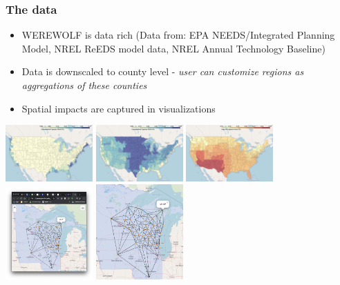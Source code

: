 \documentclass[xcolor=dvipsnames]{beamer}
\begin{document}
\begin{frame}
  \frametitle{The data}

\begin{itemize}
  \item WEREWOLF is data rich (Data from: EPA NEEDS/Integrated Planning Model, NREL ReEDS model data, NREL Annual Technology Baseline)
  \item Data is downscaled to county level - \emph{user can customize regions as aggregations of these counties}
  \item Spatial impacts are captured in visualizations
\end{itemize}

  \includegraphics[width=0.25\textwidth]{includes/data_offshore_wind.png}
  \includegraphics[width=0.25\textwidth]{includes/data_onshore_wind.png}
  \includegraphics[width=0.25\textwidth]{includes/data_solar.png}
  \includegraphics[width=0.25\textwidth]{includes/data_network_browser_view.png}
  \includegraphics[width=0.25\textwidth]{includes/data_network_no_browser_w_popup.png}


\end{frame}
\end{document}
